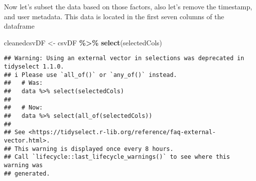 \documentclass[
]{article}
\newenvironment{Shaded}{\begin{snugshade}}{\end{snugshade}}
\newcommand{\CommentTok}[1]{\textcolor[rgb]{0.56,0.35,0.01}{\textit{#1}}}
\newcommand{\DecValTok}[1]{\textcolor[rgb]{0.00,0.00,0.81}{#1}}
\newcommand{\DocumentationTok}[1]{\textcolor[rgb]{0.56,0.35,0.01}{\textbf{\textit{#1}}}}
\newcommand{\FunctionTok}[1]{\textcolor[rgb]{0.13,0.29,0.53}{\textbf{#1}}}
\newcommand{\NormalTok}[1]{#1}
\newcommand{\OtherTok}[1]{\textcolor[rgb]{0.56,0.35,0.01}{#1}}
\newcommand{\SpecialCharTok}[1]{\textcolor[rgb]{0.81,0.36,0.00}{\textbf{#1}}}
\newcommand{\StringTok}[1]{\textcolor[rgb]{0.31,0.60,0.02}{#1}}
\begin{document}
Now let's subset the data based on those factors, also let's remove the
timestamp, and user metadata. This data is located in the first seven
columns of the dataframe

\begin{Shaded}
\begin{Highlighting}[]
\NormalTok{cleanedcsvDF }\OtherTok{\textless{}{-}}\NormalTok{ csvDF }\SpecialCharTok{\%\textgreater{}\%} \FunctionTok{select}\NormalTok{(selectedCols)}
\end{Highlighting}
\end{Shaded}

\begin{verbatim}
## Warning: Using an external vector in selections was deprecated in tidyselect 1.1.0.
## i Please use `all_of()` or `any_of()` instead.
##   # Was:
##   data %>% select(selectedCols)
## 
##   # Now:
##   data %>% select(all_of(selectedCols))
## 
## See <https://tidyselect.r-lib.org/reference/faq-external-vector.html>.
## This warning is displayed once every 8 hours.
## Call `lifecycle::last_lifecycle_warnings()` to see where this warning was
## generated.
\end{verbatim}

\begin{Shaded}
\end{Shaded}
\end{document}
